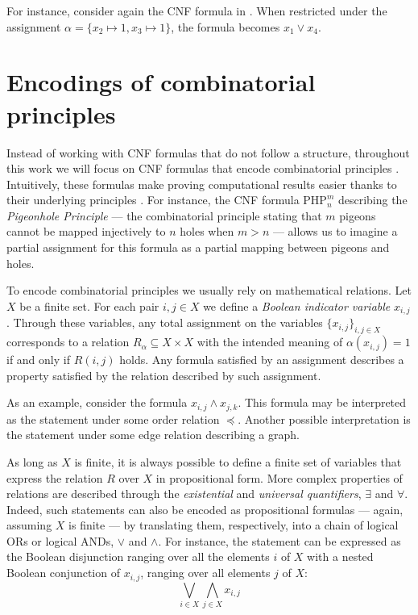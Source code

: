 For instance, consider again the CNF formula in . When restricted under the assignment $\alpha = \{x_2 \mapsto 1, x_3 \mapsto 1\}$, the formula becomes $x_1 \lor x_4$.

\section{Encodings of combinatorial principles}

Instead of working with CNF formulas that do not follow a structure, throughout this work we will focus on CNF formulas that encode combinatorial principles \cite{kraj_book,handbook_sat,galesi_toran}. Intuitively, these formulas make proving computational results easier thanks to their underlying principles \cite{kraj_book,galesi_toran}. For instance, the CNF formula $\mathrm{PHP}^{m}_n$ describing the \textit{Pigeonhole Principle} --- the combinatorial principle stating that $m$ pigeons cannot be mapped injectively to $n$ holes when $m > n$ --- allows us to imagine a partial assignment for this formula as a partial mapping between pigeons and holes.

To encode combinatorial principles we usually rely on mathematical relations. Let $X$ be a finite set. For each pair $i,j \in X$ we define a \textit{Boolean indicator variable} $x_{i,j}$. Through these variables, any total assignment on the variables $\{x_{i,j}\}_{i,j \in X}$ corresponds to a relation $R_{\alpha} \subseteq X \times X$ with the intended meaning of $\alpha(x_{i,j}) = 1$ if and only if $R(i,j)$ holds. Any formula satisfied by an assignment describes a property satisfied by the relation described by such assignment.

As an example, consider the formula $x_{i,j} \land x_{j,k}$. This formula may be interpreted as the statement  under some order relation $\preceq$. Another possible interpretation is the statement  under some edge relation describing a graph.

As long as $X$ is finite, it is always possible to define a finite set of variables that express the relation $R$ over $X$ in propositional form. More complex properties of relations are described through the \textit{existential} and \textit{universal quantifiers}, $\exists$ and $\forall$. Indeed, such statements can also be encoded as propositional formulas --- again, assuming $X$ is finite --- by translating them, respectively, into a chain of logical ORs or logical ANDs, $\lor$ and $\land$. For instance, the statement  can be expressed as the Boolean disjunction ranging over all the elements $i$ of $X$ with a nested Boolean conjunction of $x_{i,j}$, ranging over all elements $j$ of $X$:
\begin{equation}
  \bigvee_{i \in X} \bigwedge_{j \in X} x_{i,j}
\end{equation}

